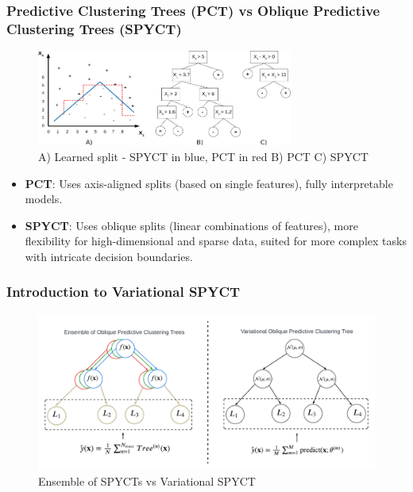 \documentclass{beamer}
\begin{document}
\begin{frame}
  \frametitle{Predictive Clustering Trees (PCT) vs Oblique Predictive Clustering Trees (SPYCT)}
  
  \begin{figure}
    \centering
    \includegraphics[width=0.75\textwidth]{images/pct_spyct.jpg}
    {\tiny \caption{A) Learned split - SPYCT in blue, PCT in red B) PCT C) SPYCT~\cite{Stepi_nik_2021}}}
  \end{figure}
  
  \vspace{0.05cm} %
  
  \begin{itemize}
    \item \textbf{PCT}: Uses axis-aligned splits (based on single features), fully interpretable models.
    \item \textbf{SPYCT}: Uses oblique splits (linear combinations of features), more flexibility for high-dimensional and sparse data, suited for more complex tasks with intricate decision boundaries.
  \end{itemize}
  
\end{frame}


\begin{frame}
\frametitle{Introduction to Variational SPYCT}
  \begin{figure}
    \centering
    \includegraphics[width=1.0\textwidth]{../figures/main_flowchart.pdf}
    {\tiny \caption{Ensemble of SPYCTs vs Variational SPYCT}}
  \end{figure}
\end{frame}
\end{document}
